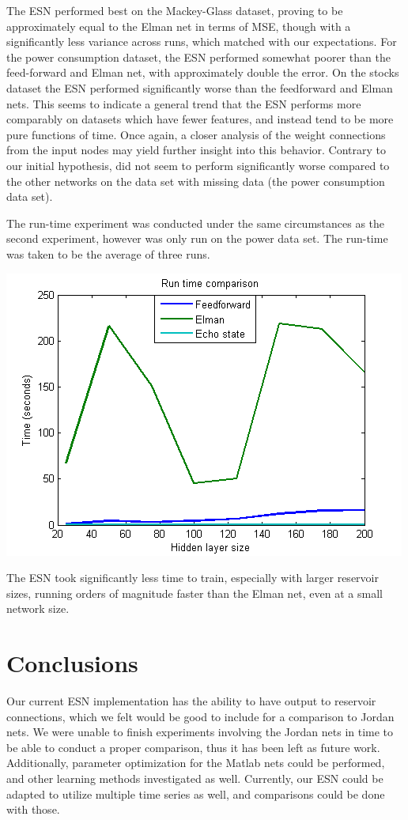 \documentclass{acm_proc_article-sp}
\begin{document}
The ESN performed best on the Mackey-Glass dataset, proving to be approximately equal to the Elman net in terms of MSE, though with a significantly less variance across runs, which matched with our expectations. For the power consumption dataset, the ESN performed somewhat poorer than the feed-forward and Elman net, with approximately double the error. On the stocks dataset the ESN performed significantly worse than the feedforward and Elman nets. This seems to indicate a general trend that the ESN performs more comparably on datasets which have fewer features, and instead tend to be more pure functions of time. Once again, a closer analysis of the weight connections from the input nodes may yield further insight into this behavior. Contrary to our initial hypothesis, did not seem to perform significantly worse compared to the other networks on the data set with missing data (the power consumption data set). 

The run-time experiment was conducted under the same circumstances as the second experiment, however was only run on the power data set. The run-time was taken to be the average of three runs.

\begin{center}
\includegraphics[scale=0.7]{time_plot.png}
\end{center}

The ESN took significantly less time to train, especially with larger reservoir sizes, running orders of magnitude faster than the Elman net, even at a small network size.

\section{Conclusions}
Our current ESN implementation has the ability to have output to reservoir connections, which we felt would be good to include for a comparison to Jordan nets. We were unable to finish experiments involving the Jordan nets in time to be able to conduct a proper comparison, thus it has been left as future work. Additionally, parameter optimization for the Matlab nets could be performed, and other learning methods investigated as well. Currently, our ESN could be adapted to utilize multiple time series as well, and comparisons could be done with those.
\end{document}
